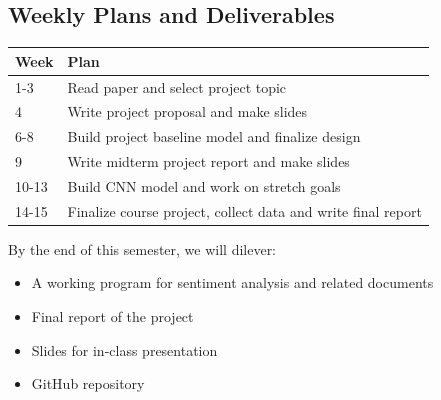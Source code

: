 \documentclass[conference]{IEEEtran}
\begin{document}
\subsection{Weekly Plans and Deliverables}
\label{manage:plan}

    \begin{center}
        \begin{tabular}{| l | p{7cm} |}
        \hline
        Week & Plan \\ \hline
        1-3 & Read paper and select project topic \\ \hline
        4 & Write project proposal and make slides \\ \hline
        6-8 & Build project baseline model and finalize design \\ \hline
        9 & Write midterm project report and make slides \\ \hline
        10-13 & Build CNN model and work on stretch goals \\ \hline
        14-15 & Finalize course project, collect data and write final report \\ \hline
        \end{tabular}
    \end{center}

    By the end of this semester, we will dilever:
    \begin{itemize}
    \item A working program for sentiment analysis and related documents
    \item Final report of the project
    \item Slides for in-class presentation
    \item GitHub repository
    \end{itemize}



\end{document}
